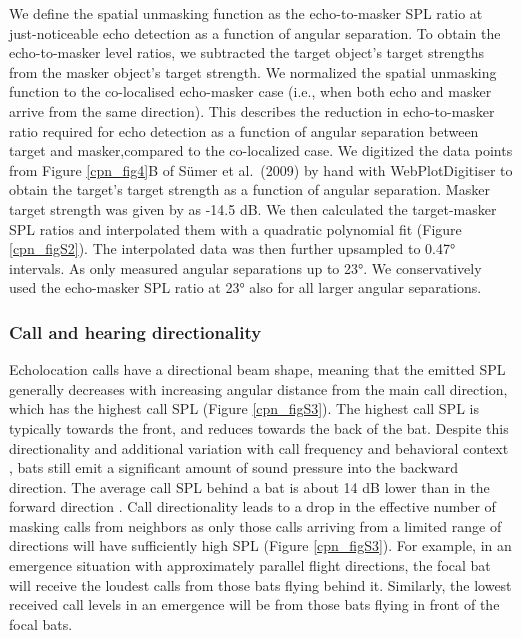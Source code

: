 \documentclass[
]{book}
\begin{document}
We define the spatial unmasking function as the echo-to-masker SPL ratio at just-noticeable echo detection as a function of angular separation. To obtain the echo-to-masker level ratios, we subtracted the target object's target strengths from the masker object's target strength. We normalized the spatial unmasking function to the co-localised echo-masker case (i.e., when both echo and masker arrive from the same direction). This describes the reduction in echo-to-masker ratio required for echo detection as a function of angular separation between target and masker,compared to the co-localized case. We digitized the data points from Figure \ref{cpn_fig4}B of Sümer et al.~(2009) by hand with WebPlotDigitiser \citep{rohatgi2015a} to obtain the target's target strength as a function of angular separation. Masker target strength was given by \citet{suemer2009a} as -14.5 dB. We then calculated the target-masker SPL ratios and interpolated them with a quadratic polynomial fit (Figure \ref{cpn_figS2}). The interpolated data was then further upsampled to 0.47° intervals. As \citet{suemer2009a} only measured angular separations up to 23°. We conservatively used the echo-masker SPL ratio at 23° also for all larger angular separations.

\hypertarget{call-and-hearing-directionality}{%
\subsubsection{\texorpdfstring{Call and hearing directionality \label{cpn_directionality}}{Call and hearing directionality }}\label{call-and-hearing-directionality}}

Echolocation calls have a directional beam shape, meaning that the emitted SPL
generally decreases with increasing angular distance from the main call direction, which has the highest call SPL (Figure \ref{cpn_figS3}). The highest call SPL is typically towards the front, and reduces towards the back of the bat. Despite this directionality and additional variation with call frequency and behavioral context \citep{jakobsen2010a, l2013a, surlykke2009.dirn, giuggioli2015a} , bats still emit a significant amount of sound pressure into the backward direction. The average call SPL behind a bat is about 14 dB lower than in the forward direction \citep[\citet{stidsholt2018a}]{giuggioli2015a}. Call directionality leads to a drop in the effective number of masking calls from neighbors as only those calls arriving from a limited range of directions will have sufficiently high SPL (Figure \ref{cpn_figS3}). For example, in an emergence situation with approximately parallel flight directions, the focal bat will receive the loudest calls from those bats flying behind it. Similarly, the lowest received call levels in an emergence will be from those bats flying in front of the focal bats.
\end{document}
